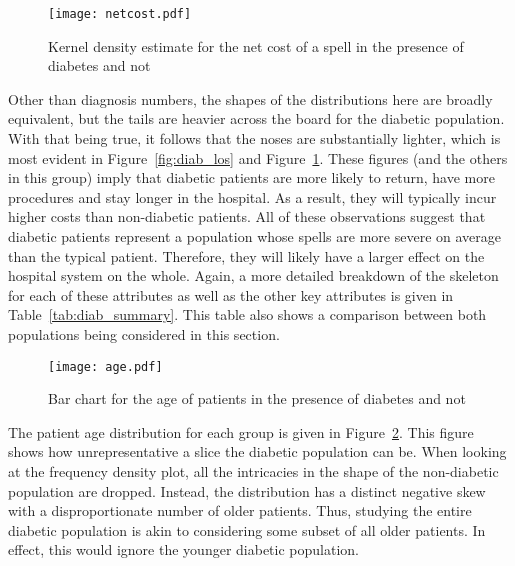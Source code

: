 \begin{figure}
    \centering
    \texttt{[image: netcost.pdf]}
    \caption{%
        Kernel density estimate for the net cost of a spell in the presence of
        diabetes and not
    }\label{fig:diab_netcost}
\end{figure}

Other than diagnosis numbers, the shapes of the distributions here are broadly
equivalent, but the tails are heavier across the board for the diabetic
population. With that being true, it follows that the noses are substantially
lighter, which is most evident in Figure~\ref{fig:diab_los} and
Figure~\ref{fig:diab_netcost}. These figures (and the others in this group)
imply that diabetic patients are more likely to return, have more procedures and
stay longer in the hospital. As a result, they will typically incur higher costs
than non-diabetic patients. All of these observations suggest that diabetic
patients represent a population whose spells are more severe on average than the
typical patient. Therefore, they will likely have a larger effect on the
hospital system on the whole. Again, a more detailed breakdown of the skeleton
for each of these attributes as well as the other key attributes is given in
Table~\ref{tab:diab_summary}. This table also shows a comparison between both
populations being considered in this section.


\begin{figure}
    \centering
    \texttt{[image: age.pdf]}
    \caption{%
        Bar chart for the age of patients in the presence of diabetes and not
    }\label{fig:diab_age}
\end{figure}

The patient age distribution for each group is given in
Figure~\ref{fig:diab_age}. This figure shows how unrepresentative a slice the
diabetic population can be. When looking at the frequency density plot, all the
intricacies in the shape of the non-diabetic population are dropped. Instead,
the distribution has a distinct negative skew with a disproportionate number of
older patients. Thus, studying the entire diabetic population is akin to
considering some subset of all older patients. In effect, this would ignore the
younger diabetic population.

